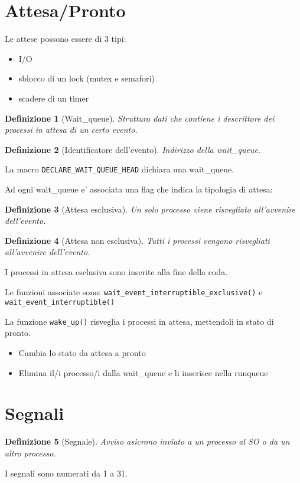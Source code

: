 \documentclass[12pt, a4paper]{report}
\newtheorem{definition}{Definizione}
\begin{document}
\section{Attesa/Pronto}
Le attese possono essere di 3 tipi:
\begin{itemize}
	\item I/O
	\item sblocco di un lock (mutex e semafori)
	\item scadere di un timer
\end{itemize}

\begin{definition}[Wait\_queue]
	Struttura dati che contiene i descrittore dei processi in attesa di un certo
	evento.
\end{definition}
\begin{definition}[Identificatore dell'evento]
	Indirizzo della wait\_queue.
\end{definition}
La macro \texttt{DECLARE\_WAIT\_QUEUE\_HEAD} dichiara una wait\_queue.

Ad ogni wait\_queue e' associata una flag che indica la tipologia di attesa:
\begin{definition}[Attesa esclusiva]
	Un solo processo viene risvegliato all'avvenire dell'evento.
\end{definition}
\begin{definition}[Attesa non esclusiva]
	Tutti i processi vengono risvegliati all'avvenire dell'evento.
\end{definition}
I processi in attesa esclusiva sono inserite alla fine della coda.

Le funzioni associate sono: \texttt{wait\_event\_interruptible\_exclusive()} e
\texttt{wait\_event\_interruptible()}

La funzione \texttt{wake\_up()} risveglia i processi in attesa, mettendoli in
stato di pronto.
\begin{itemize}
	\item Cambia lo stato da attesa a pronto
	\item Elimina il/i processo/i dalla wait\_queue e li inserisce nella
	      runqueue
\end{itemize}
\section{Segnali}
\begin{definition}[Segnale]
	Avviso asicrono inviato a un processo al SO o da un altro processo.
\end{definition}
I segnali sono numerati da 1 a 31.
\end{document}
